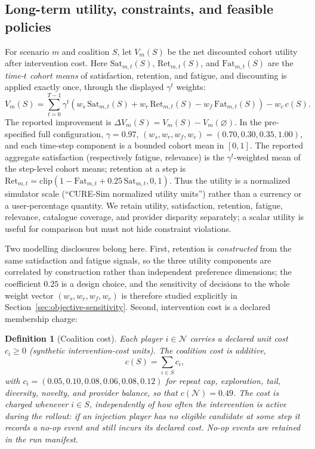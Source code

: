 \documentclass[pdflatex,sn-mathphys-num]{sn-jnl}
\theoremstyle{thmstyleone}
\theoremstyle{thmstyletwo}
\theoremstyle{thmstylethree}
\newtheorem{definition}{Definition}
\newcommand{\Players}{\mathcal{N}}
\newcommand{\Utility}{V}
\begin{document}
\subsection{Long-term utility, constraints, and feasible policies}

For scenario $m$ and coalition $S$, let $\Utility_m(S)$ be the net discounted cohort utility after intervention cost. Here $\mathrm{Sat}_{m,t}(S)$, $\mathrm{Ret}_{m,t}(S)$, and $\mathrm{Fat}_{m,t}(S)$ are the \emph{time-$t$ cohort means} of satisfaction, retention, and fatigue, and discounting is applied exactly once, through the displayed $\gamma^t$ weights:
\begin{equation}
 \Utility_m(S)=\sum_{t=0}^{T-1}\gamma^t\left(w_s\,\mathrm{Sat}_{m,t}(S)+w_r\,\mathrm{Ret}_{m,t}(S)-w_f\,\mathrm{Fat}_{m,t}(S)\right)-w_c\,c(S).
\label{eq:utility}
\end{equation}
The reported improvement is $\Delta\Utility_m(S)=\Utility_m(S)-\Utility_m(\varnothing)$. In the pre-specified full configuration, $\gamma=0.97$, $(w_s,w_r,w_f,w_c)=(0.70,0.30,0.35,1.00)$, and each time-step component is a bounded cohort mean in $[0,1]$. The reported aggregate satisfaction (respectively fatigue, relevance) is the $\gamma^t$-weighted mean of the step-level cohort means; retention at a step is $\mathrm{Ret}_{m,t}=\mathrm{clip}(1-\mathrm{Fat}_{m,t}+0.25\,\mathrm{Sat}_{m,t},0,1)$. Thus the utility is a normalized simulator scale (``CURE-Sim normalized utility units'') rather than a currency or a user-percentage quantity. We retain utility, satisfaction, retention, fatigue, relevance, catalogue coverage, and provider disparity separately; a scalar utility is useful for comparison but must not hide constraint violations.

Two modelling disclosures belong here. First, retention is \emph{constructed} from the same satisfaction and fatigue signals, so the three utility components are correlated by construction rather than independent preference dimensions; the coefficient $0.25$ is a design choice, and the sensitivity of decisions to the whole weight vector $(w_s,w_r,w_f,w_c)$ is therefore studied explicitly in Section~\ref{sec:objective-sensitivity}. Second, intervention cost is a declared membership charge:

\begin{definition}[Coalition cost]\label{def:cost}
Each player $i\in\Players$ carries a declared unit cost $c_i\geq0$ (synthetic intervention-cost units). The coalition cost is additive,
\begin{equation}
 c(S)=\sum_{i\in S}c_i,
\label{eq:cost}
\end{equation}
with $c_i=(0.05,0.10,0.08,0.06,0.08,0.12)$ for repeat cap, exploration, tail, diversity, novelty, and provider balance, so that $c(\Players)=0.49$. The cost is charged whenever $i\in S$, independently of how often the intervention is active during the rollout: if an injection player has no eligible candidate at some step it records a no-op event and still incurs its declared cost. No-op events are retained in the run manifest.
\end{definition}
\end{document}
